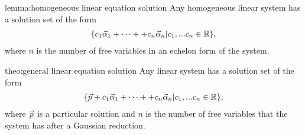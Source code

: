 \begin{lemm}{lemma:homogeneous linear equation solution}
	Any homogeneous linear system has a solution set of the form
	\begin{align*}
	\{c_1\vec{\alpha}_1+\cdots++c_n\vec{\alpha}_n| c_1,...c_n \in {\mathbb R}\},
	\end{align*}
	where $n$ is the number of free variables in an echelon form of the system.
\end{lemm}


\begin{theo}{theo:general linear equation solution}
	Any linear system has a solution set of the form
	\begin{align*}
	\{\vec{p}+c_1\vec{\alpha}_1+\cdots++c_n\vec{\alpha}_n| c_1,...c_n \in {\mathbb R}\},
	\end{align*}
	where $\vec{p}$ is a particular solution and $n$ is the number of free variables that the system has after a Gaussian reduction.
\end{theo}